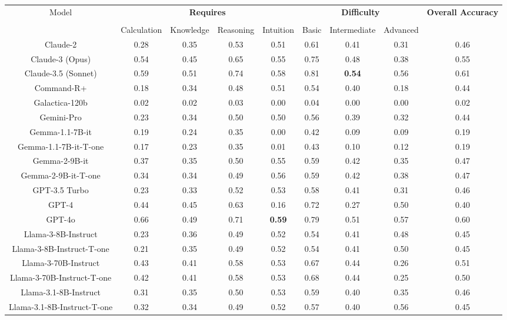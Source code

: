 \begin{tabular}{ccccccccc}
\toprule
\multirow{3}{*}{Model} & \multicolumn{4}{c}{\textbf{Requires}} & \multicolumn{3}{c}{\textbf{Difficulty}} & \multirow{3}{*}{\textbf{Overall Accuracy}}\\\cmidrule(lr){2-5} \cmidrule(lr){6-8}\\
 & Calculation & Knowledge & Reasoning & Intuition & Basic & Intermediate & Advanced &  \\
\midrule
Claude-2 & 0.28 & 0.35 & 0.53 & 0.51 & 0.61 & 0.41 & 0.31 & 0.46 \\
Claude-3 (Opus) & 0.54 & 0.45 & 0.65 & 0.55 & 0.75 & 0.48 & 0.38 & 0.55 \\
Claude-3.5 (Sonnet) & 0.59 & 0.51 & 0.74 & 0.58 & 0.81 & \textbf{0.54} & 0.56 & 0.61 \\
Command-R+ & 0.18 & 0.34 & 0.48 & 0.51 & 0.54 & 0.40 & 0.18 & 0.44 \\
Galactica-120b & 0.02 & 0.02 & 0.03 & 0.00 & 0.04 & 0.00 & 0.00 & 0.02 \\
Gemini-Pro & 0.23 & 0.34 & 0.50 & 0.50 & 0.56 & 0.39 & 0.32 & 0.44 \\
Gemma-1.1-7B-it & 0.19 & 0.24 & 0.35 & 0.00 & 0.42 & 0.09 & 0.09 & 0.19 \\
Gemma-1.1-7B-it-T-one & 0.17 & 0.23 & 0.35 & 0.01 & 0.43 & 0.10 & 0.12 & 0.19 \\
Gemma-2-9B-it & 0.37 & 0.35 & 0.50 & 0.55 & 0.59 & 0.42 & 0.35 & 0.47 \\
Gemma-2-9B-it-T-one & 0.34 & 0.34 & 0.49 & 0.56 & 0.59 & 0.42 & 0.38 & 0.47 \\
GPT-3.5 Turbo & 0.23 & 0.33 & 0.52 & 0.53 & 0.58 & 0.41 & 0.31 & 0.46 \\
GPT-4 & 0.44 & 0.45 & 0.63 & 0.16 & 0.72 & 0.27 & 0.50 & 0.40 \\
GPT-4o & 0.66 & 0.49 & 0.71 & \textbf{0.59} & 0.79 & 0.51 & 0.57 & 0.60 \\
Llama-3-8B-Instruct & 0.23 & 0.36 & 0.49 & 0.52 & 0.54 & 0.41 & 0.48 & 0.45 \\
Llama-3-8B-Instruct-T-one & 0.21 & 0.35 & 0.49 & 0.52 & 0.54 & 0.41 & 0.50 & 0.45 \\
Llama-3-70B-Instruct & 0.43 & 0.41 & 0.58 & 0.53 & 0.67 & 0.44 & 0.26 & 0.51 \\
Llama-3-70B-Instruct-T-one & 0.42 & 0.41 & 0.58 & 0.53 & 0.68 & 0.44 & 0.25 & 0.50 \\
Llama-3.1-8B-Instruct & 0.31 & 0.35 & 0.50 & 0.53 & 0.59 & 0.40 & 0.35 & 0.46 \\
Llama-3.1-8B-Instruct-T-one & 0.32 & 0.34 & 0.49 & 0.52 & 0.57 & 0.40 & 0.56 & 0.45 \\

\end{tabular}
